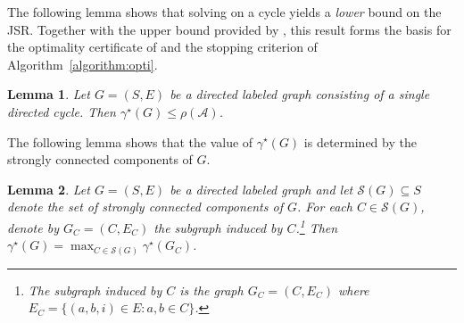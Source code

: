 \documentclass[letterpaper, 10 pt, conference]{ieeeconf}  %
\newtheorem{lemma}{Lemma}
\newif\ifextended
\begin{document}
The following lemma shows that solving  on a cycle yields a \emph{lower} bound on the JSR. Together with the upper bound provided by , this result forms the basis for the optimality certificate of  and the stopping criterion of Algorithm~\ref{algorithm:opti}.
\begin{lemma}\label{lemma:lb_on_cycle}
Let $G=(S,E)$ be a directed labeled graph consisting of a single directed cycle. Then $\gamma^\star (G) \le \rho(\mathcal A)$.
\end{lemma}
\ifextended
\begin{proof}
The constraints of \Cref{prob:graph_opt} read
\[
\gamma^2 P_{a_j} \succeq A_{i_j}^\top P_{a_{j+1}} A_{i_j},
\quad j=1,\dots,k,
\]
with $a_{k+1}=a_1$. Composing along the cycle gives
\[
\gamma^{2k} P_{a_1} \succeq
(A_{i_k}\cdots A_{i_1})^\top
P_{a_1}
(A_{i_k}\cdots A_{i_1}).
\]
The infimum of $\gamma^{2k}$ for which there exists
$P_{a_1}\succ0$ satisfying this inequality is known to be $\rho(A_{i_k}\cdots A_{i_1})^2$~\cite{boyd1994lmi}. Hence
\[
\gamma^\star (G)=\rho(A_{i_k}\cdots A_{i_1})^{1/k}.
\]
Since for any product $A_{i_k}\cdots A_{i_1}$, one has $\rho(\mathcal A)\ge \rho(A_{i_k}\cdots A_{i_1})^{1/k}$,
we obtain $\gamma^\star(G)\le\rho(\mathcal A)$.
\end{proof}
\fi
The following lemma shows that the value of $\gamma^\star(G)$ is determined by the
strongly connected components of $G$.
\begin{lemma}
Let $G=(S,E)$ be a directed labeled graph and
let $\mathcal S(G)\subseteq S$ denote the set of strongly connected
components of $G$.
For each $C \in \mathcal S(G)$, denote by
$G_C=(C,E_C)$ the subgraph induced by $C$.\footnote{The subgraph induced by $C$ is the graph $G_C=(C,E_C)$ where $E_C=\{(a,b,i)\in E : a,b\in C\}$.}
Then $\gamma^\star (G)
=
\max_{C \in \mathcal S(G)}
\gamma^\star (G_C)$.
\label{lemma:strongly_connected_comp}
\end{lemma}
\ifextended
\end{document}
